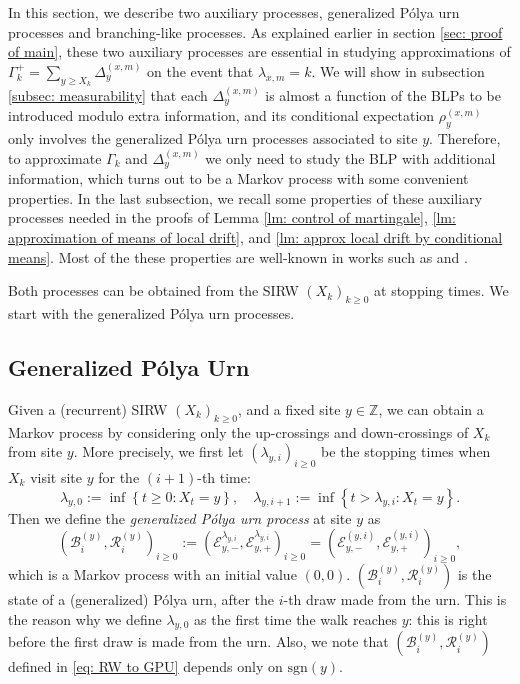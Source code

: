 \documentclass[EJP]{ejpecp} %
\begin{document}
In this section, we describe two auxiliary processes, generalized P\'{o}lya urn processes and branching-like processes. As explained earlier in section \ref{sec: proof of main}, these two auxiliary processes are essential in studying approximations of $\Gamma_k^+= \sum_{y\geq X_k} \Delta_{y}^{(x,m)}$ on the event that $\lambda_{x,m} = k$. We will show in subsection \ref{subsec: measurability} that each $\Delta^{(x,m)}_{y}$ is almost a function of the BLPs to be introduced modulo extra information, and its conditional expectation $\rho^{(x,m)}_{y}$ only involves the generalized P\'{o}lya urn processes associated to site $y$. Therefore, to approximate $\Gamma_k$ and $\Delta_{y}^{(x,m)}$ we only need to study the BLP with additional information, which turns out to be a Markov process with some convenient properties. In the last subsection, we recall some properties of these auxiliary processes needed in the proofs of Lemma \ref{lm: control of martingale}, \ref{lm: approximation of means of local drift}, and \ref{lm: approx local drift by conditional means}. Most of the these properties are well-known in works such as \cite{KP16} and \cite{KMP23}. 

Both processes can be obtained from the SIRW $(X_k)_{k\geq 0}$ at stopping times. We start with the generalized P\'{o}lya urn processes. 

\subsection{Generalized P\'{o}lya Urn}
Given a (recurrent) SIRW $(X_k)_{k\geq 0}$, and a fixed site $y\in \mathbb{Z}$, we can obtain a Markov process by considering only the up-crossings and down-crossings of $X_k$ from site $y$. More precisely, we first let $(\lambda_{y,i})_{i\geq 0}$ be the stopping times when $X_k$ visit site $y$ for the $\left( i+1 \right) $-th time:
\[
\lambda_{y,0} :=\inf\left\{ t\geq 0: X_t = y \right\} , \quad \lambda_{y,i+1} := \inf\left\{ t> \lambda_{y, i}: X_t = y \right\}.
\] 
Then we define the \textit{generalized P\'olya urn process} at site $y$ as 
\begin{equation} \label{eq: RW to GPU}
	\left(\mathscr{B}^{(y)}_{i},\mathscr{R}^{(y)}_{i} \right)_{i\ge 0}
	:=\left(\mathcal{E}^{\lambda_{y,i}}_{y,-}, \mathcal{E}^{\lambda_{y,i}}_{y,+}\right)_{i\geq 0} 
	=  \left(\mathcal{E}^{(y,i)}_{y,-}, \mathcal{E}^{(y,i)}_{y,+}\right)_{i\geq 0},
\end{equation}
which is a Markov process with an initial value $(0,0)$. 
$\left(\mathscr{B}_{i}^{(y)},\mathscr{R}_{i}^{(y)} \right)$ is the state of a (generalized) P\'olya urn, after the $i$-th draw made from the urn. This is the reason why we define $\lambda_{y, 0}$ as the first time the walk reaches $y$: this is right before the first draw is made from the urn. Also, we note that $\left(\mathscr{B}_{i}^{(y)},\mathscr{R}_{i}^{(y)} \right)$ defined in \eqref{eq: RW to GPU} depends only on $\text{sgn}(y)$.
\end{document}
